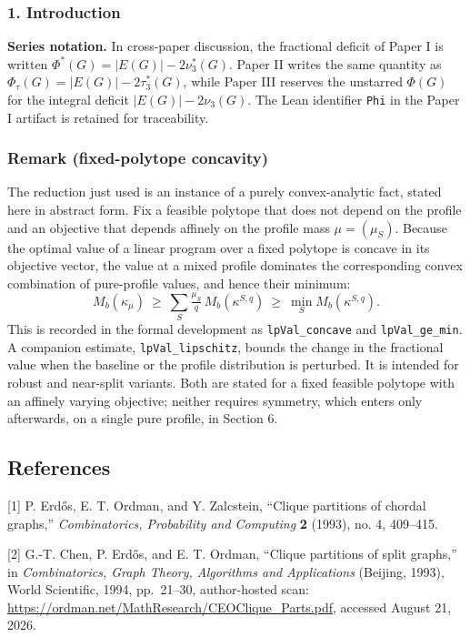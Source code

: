 \documentclass[english,11pt,a4paper]{article}
\begin{document}
\subsubsection{1. Introduction}\label{introduction}

\textbf{Series notation.} In cross-paper discussion, the fractional
deficit of Paper I is written \(\Phi^*(G)=|E(G)|-2\nu_3^*(G)\). Paper II
writes the same quantity as \(\Phi_\tau(G)=|E(G)|-2\tau_3^*(G)\), while
Paper III reserves the unstarred \(\Phi(G)\) for the integral deficit
\(|E(G)|-2\nu_3(G)\). The Lean identifier \nolinkurl{Phi} in the Paper I
artifact is retained for traceability.

\subsubsection{Remark (fixed-polytope
concavity)}\label{remark-fixed-polytope-concavity}

The reduction just used is an instance of a purely convex-analytic fact,
stated here in abstract form. Fix a feasible polytope that does not
depend on the profile and an objective that depends affinely on the
profile mass \(\mu=(\mu_S)\). Because the optimal value of a linear
program over a fixed polytope is concave in its objective vector, the
value at a mixed profile dominates the corresponding convex combination
of pure-profile values, and hence their minimum: \[
M_b(\kappa_\mu)\ \ge\ \sum_S \tfrac{\mu_S}{q}\,M_b(\kappa^{S,q})\ \ge\ \min_S M_b(\kappa^{S,q}).
\] This is recorded in the formal development as \nolinkurl{lpVal_concave}
and \nolinkurl{lpVal_ge_min}. A companion estimate,
\nolinkurl{lpVal_lipschitz}, bounds the change in the fractional value
when the baseline or the profile distribution is perturbed. It is
intended for robust and near-split variants. Both are stated for a fixed
feasible polytope with an affinely varying objective; neither requires
symmetry, which enters only afterwards, on a single pure profile, in
Section 6.

\subsection{References}\label{references}

{[}1{]} P. Erdős, E. T. Ordman, and Y. Zalcstein, ``Clique partitions of
chordal graphs,'' \emph{Combinatorics, Probability and Computing}
\textbf{2} (1993), no. 4, 409--415.

{[}2{]} G.-T. Chen, P. Erdős, and E. T. Ordman, ``Clique partitions of
split graphs,'' in \emph{Combinatorics, Graph Theory, Algorithms and
Applications} (Beijing, 1993), World Scientific, 1994, pp.~21--30,
author-hosted scan:
\url{https://ordman.net/MathResearch/CEOClique_Parts.pdf}, accessed
August 21, 2026.
\end{document}
